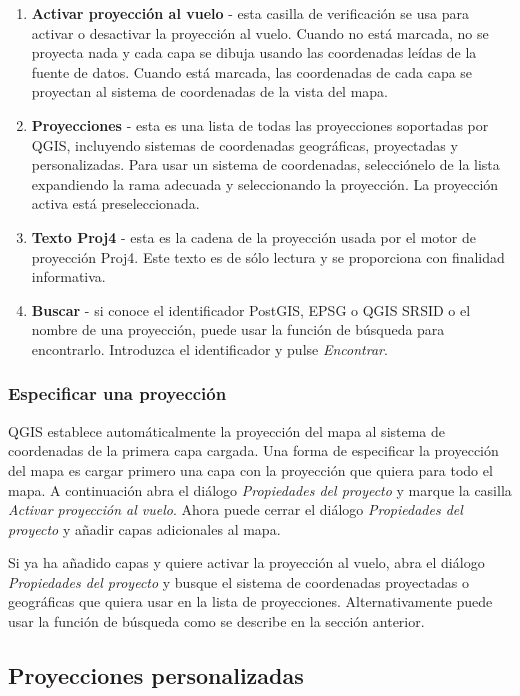 \begin{enumerate}
\item \textbf{Activar proyección al vuelo} - esta casilla de verificación se usa para activar o desactivar la proyección al vuelo. Cuando no está marcada, no se proyecta nada y cada capa se dibuja usando las coordenadas leídas de la fuente de datos. Cuando está marcada, las coordenadas de cada capa se proyectan al sistema de coordenadas de la vista del mapa.
\item \textbf{Proyecciones} - esta es una lista de todas las proyecciones soportadas por QGIS, incluyendo sistemas de coordenadas geográficas, proyectadas y personalizadas. Para usar un sistema de coordenadas, selecciónelo de la lista expandiendo la rama adecuada y seleccionando la proyección. La proyección activa está preseleccionada.
\item \textbf{Texto Proj4} - esta es la cadena de la proyección usada por el motor de proyección Proj4. Este texto es de sólo lectura y se proporciona con finalidad informativa.
\item \textbf{Buscar} - si conoce el identificador PostGIS, EPSG o QGIS SRSID o el nombre de una proyección, puede usar la función de búsqueda para encontrarlo. Introduzca el identificador y pulse \textit{Encontrar}.
\end{enumerate}

\subsubsection{Especificar una proyección}
\label{sec:proyección-specifying}

QGIS establece automáticalmente la proyección del mapa al sistema de coordenadas de la primera capa cargada. Una forma de especificar la proyección del mapa es cargar primero una capa con la proyección que quiera para todo el mapa. A continuación abra el diálogo \textit{Propiedades del proyecto} y marque la casilla \textit{Activar
proyección al vuelo}. Ahora puede cerrar el diálogo \textit{Propiedades del proyecto} y añadir capas adicionales al mapa. 

Si ya ha añadido capas y quiere activar la proyección al vuelo, abra el diálogo \textit{Propiedades del proyecto} y busque el sistema de coordenadas proyectadas o geográficas que quiera usar en la lista de proyecciones. Alternativamente puede usar la función de búsqueda como se describe en la sección anterior.

\subsection{Proyecciones personalizadas}\label{sec:customprojections}

